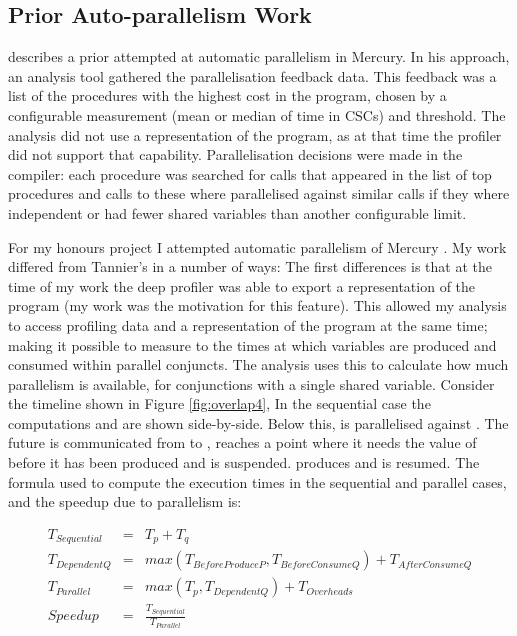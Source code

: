\subsection{Prior Auto-parallelism Work}
\label{sec:backgnd_priorautopar}

\citet{tannier:2007:parallel_mercury} describes a prior attempted at automatic
parallelism in Mercury.
In his approach, 
an analysis tool gathered the parallelisation feedback data.
This feedback was a list of the procedures with the highest cost in the program,
chosen by a configurable measurement (mean or median of time in CSCs) and threshold.
The analysis did not use a representation of the program,
as at that time the profiler did not support that capability.
Parallelisation decisions were made in the compiler:
each procedure was searched for calls that appeared in the list of top procedures
and calls to these where parallelised against similar calls if they
where independent or had fewer shared variables than another configurable limit.

For my honours project I attempted automatic parallelism of Mercury
\citep{bone:2008:hons}.
My work differed from Tannier's in a number of ways:
The first differences is that at the time of my work the deep profiler
was able to export a representation of the program
(my work was the motivation for this feature).
This allowed my analysis to access profiling data and a representation
of the program at the same time;
making it possible to measure to the times at which variables are produced
and consumed within parallel conjuncts.
The analysis uses this to calculate how much parallelism is available,
for conjunctions with a single shared variable.
Consider the timeline shown in Figure \ref{fig:overlap4},
In the sequential case the computations  and  are shown
side-by-side.
Below this,  is parallelised against .
The future  is communicated from  to ,
 reaches a point where it needs the value of  before it has
been produced and is suspended.
 produces  and  is resumed.
The formula used to compute the execution times in the sequential and parallel
cases, and the speedup due to parallelism is:


\begin{eqnarray*}
T_{Sequential} & = & T_p + T_q \\
T_{DependentQ} & = & max(T_{BeforeProduceP}, T_{BeforeConsumeQ}) +
T_{AfterConsumeQ} \\
T_{Parallel} & = & max(T_p, T_{DependentQ}) + T_{Overheads} \\
Speedup & = & \frac{T_{Sequential}}{T_{Parallel}}
\end{eqnarray*}

